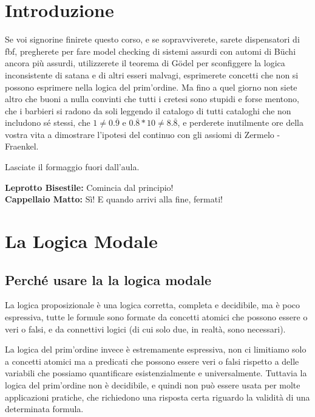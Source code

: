 
\chapter*{Introduzione}


\label{cap:introduction}



Se voi signorine finirete questo corso, e se sopravviverete, sarete
dispensatori di fbf, pregherete per fare model checking di sistemi
assurdi con automi di Büchi ancora più assurdi, utilizzerete il teorema
di Gödel per sconfiggere la logica inconsistente di satana e di altri
esseri malvagi, esprimerete concetti che non si possono esprimere
nella logica del prim'ordine. Ma fino a quel giorno non siete altro
che buoni a nulla convinti che tutti i cretesi sono stupidi e forse
mentono, che i barbieri si radono da soli leggendo il catalogo di
tutti cataloghi che non includono sé stessi, che $1\neq0.\overline{9}$
e $0.\overline{8}*10\neq8.\overline{8}$, e perderete inutilmente
ore della vostra vita a dimostrare l'ipotesi del continuo con gli
assiomi di Zermelo - Fraenkel.

Lasciate il formaggio fuori dall'aula. \\
\begin{savequote}[55mm]
\textbf{Leprotto Bisestile:} Comincia dal principio! \\
\textbf{Cappellaio Matto:} Sì! E quando arrivi alla fine, fermati!
 \end{savequote} 


\chapter{La Logica Modale}


\section{Perché usare la la logica modale}

La logica proposizionale è una logica corretta, completa e decidibile,
ma è poco espressiva, tutte le formule sono formate da concetti atomici
che possono essere o veri o falsi, e da connettivi logici (di cui
solo due, in realtà, sono necessari).

La logica del prim'ordine invece è estremamente espressiva, non ci
limitiamo solo a concetti atomici ma a predicati che possono essere
veri o falsi rispetto a delle variabili che possiamo quantificare
esistenzialmente e universalmente. Tuttavia la logica del prim'ordine
non è decidibile, e quindi non può essere usata per molte applicazioni
pratiche, che richiedono una risposta certa riguardo la validità di
una determinata formula.

